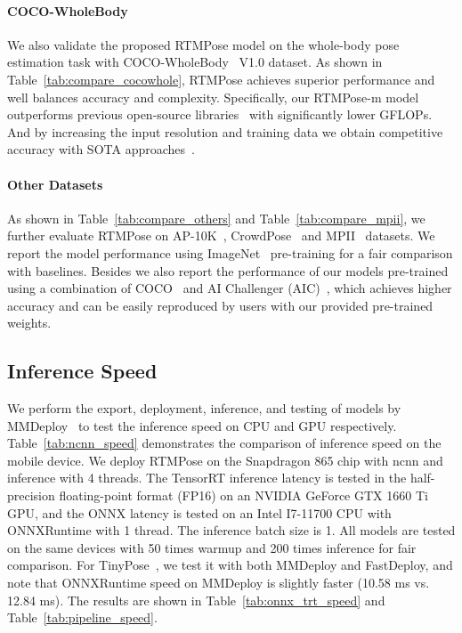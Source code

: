 \documentclass[final]{cvpr}
\begin{document}
{\paragraph{COCO-WholeBody}
We also validate the proposed RTMPose model on the whole-body pose estimation task with COCO-WholeBody~\cite{zoomnet, xu2022zoomnas} V1.0 dataset. As shown in Table~\ref{tab:compare_cocowhole}, RTMPose achieves superior performance and well balances accuracy and complexity. Specifically, our RTMPose-m model outperforms previous open-source libraries~\cite{openpose, alphapose, Yulitehrnet21} with significantly lower GFLOPs. And by increasing the input resolution and training data we obtain competitive accuracy with SOTA approaches~\cite{zoomnet, xu2022zoomnas}.

\paragraph{Other Datasets}
As shown in Table~\ref{tab:compare_others} and Table~\ref{tab:compare_mpii}, we further evaluate RTMPose on AP-10K~\cite{HangYu2021AP10KAB}, CrowdPose~\cite{JiefengLi2018CrowdPoseEC} and MPII~\cite{MykhayloAndriluka20142DHP} datasets. We report the model performance using ImageNet~\cite{JiaDeng2009ImageNetAL} pre-training for a fair comparison with baselines. Besides we also report the performance of our models pre-trained using a combination of COCO~\cite{lin2014coco} and AI Challenger (AIC)~\cite{JiahongWu2017AIC}, which achieves higher accuracy and can be easily reproduced by users with our provided pre-trained weights.

\subsection{Inference Speed}
We perform the export, deployment, inference, and testing of models by MMDeploy~\cite{mmdeploy} to test the inference speed on CPU and GPU respectively. Table~\ref{tab:ncnn_speed} demonstrates the comparison of inference speed on the mobile device. We deploy RTMPose on the Snapdragon 865 chip with ncnn and inference with 4 threads. The TensorRT inference latency is tested in the half-precision floating-point format (FP16) on an NVIDIA GeForce GTX 1660 Ti GPU, and the ONNX latency is tested on an Intel I7-11700 CPU with ONNXRuntime with 1 thread. The inference batch size is 1. All models are tested on the same devices with 50 times warmup and 200 times inference for fair comparison. For TinyPose~\cite{ppdet2019}, we test it with both MMDeploy and FastDeploy, and note that ONNXRuntime speed on MMDeploy is slightly faster  (10.58 ms vs. 12.84 ms). The results are shown in Table~\ref{tab:onnx_trt_speed} and Table~\ref{tab:pipeline_speed}. 

}
\end{document}
